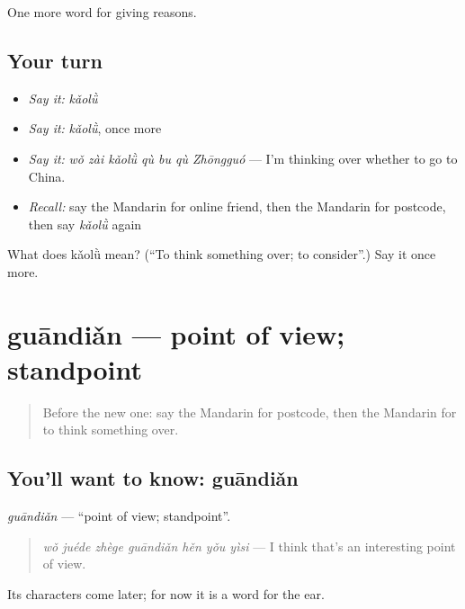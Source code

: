 \begin{grammarlens}[title={What you've built}]
One more word for giving reasons.
\end{grammarlens}

\subsection*{Your turn}
\begin{itemize}
\raggedright
  \item \emph{Say it:} \emph{kǎolǜ}
  \item \emph{Say it:} \emph{kǎolǜ}, once more
  \item \emph{Say it:} \emph{wǒ zài kǎolǜ qù bu qù Zhōngguó} — I'm thinking over whether to go to China.
  \item \emph{Recall:} say the Mandarin for online friend, then the Mandarin for postcode, then say \emph{kǎolǜ} again
\end{itemize}

\begin{tcolorbox}[breakable,colback=teal!4,colframe=teal!35!black,title={Before you move on}]
What does kǎolǜ mean? (\textquotedblleft{}To think something over; to consider\textquotedblright{}.) Say it once more.
\end{tcolorbox}
\section[guāndiǎn]{guāndiǎn — point of view; standpoint}

\label{lesson:ZH-C346-guandian}



\begin{quote}
Before the new one: say the Mandarin for postcode, then the Mandarin for to think something over.
\end{quote}

\subsection*{You'll want to know: guāndiǎn}
\emph{guāndiǎn} — \textquotedblleft{}point of view; standpoint\textquotedblright{}.

\begin{quote}
\emph{wǒ juéde zhège guāndiǎn hěn yǒu yìsi} — I think that's an interesting point of view.
\end{quote}

Its characters come later; for now it is a word for the ear.

